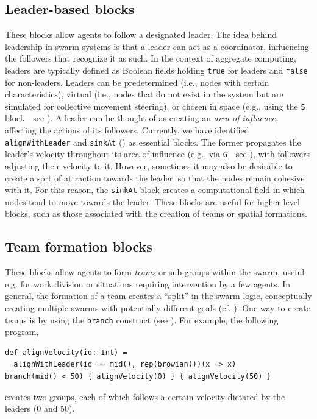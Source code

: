\subsection{Leader-based blocks}\label{coordination2023-macro:subsec:leader}
These blocks allow agents to follow a designated leader.
The idea behind leadership in swarm systems is that a leader 
 can act as a coordinator, influencing the followers that recognize it as such. 
% 
In the context of aggregate computing, 
 leaders are typically defined as Boolean fields holding \lstinline|true| for leaders 
 and \lstinline|false| for non-leaders. 
%
Leaders can be predetermined (i.e., nodes with certain characteristics), 
 virtual (i.e., nodes that do not exist in the system but are simulated for collective movement steering),
 or chosen in space (e.g., using the \lstinline|S| block---see ). %
% 
A leader can be thought of as creating an \emph{area of influence}, affecting the actions of its followers.
%
Currently, we have identified \lstinline|alignWithLeader| and \lstinline|sinkAt| () 
 as essential blocks. 
%
The former propagates the leader's velocity throughout 
 its area of influence (e.g., via \lstinline|G|---see ),
 with followers adjusting their velocity to it. 
%
However, sometimes it may also be desirable 
 to create a sort of attraction towards the leader, 
 so that the nodes remain cohesive with it. 
For this reason, the  \lstinline|sinkAt| block creates a computational field 
 in which nodes tend to move towards the leader. 
% 
These blocks are useful for higher-level blocks, 
 such as those associated with the creation of teams or spatial formations.
 
\subsection{Team formation blocks}\label{coordination2023-macro:subsec:team}
These blocks allow agents to form \emph{teams} or sub-groups within the swarm,
 useful e.g. for work division
 or situations requiring intervention by a few agents.
% 
In general, the formation of a team creates a ``split'' in the swarm logic, 
 conceptually creating multiple swarms with potentially different goals (cf. ).
One way to create teams is by using the \lstinline|branch| construct (see ). 
For example, the following program,
\begin{lstlisting}
def alignVelocity(id: Int) = 
  alighWithLeader(id == mid(), rep(browian())(x => x)
branch(mid() < 50) { alignVelocity(0) } { alignVelocity(50) }
\end{lstlisting}
creates two groups, each of which follows a certain velocity dictated by the leaders (0 and 50).

